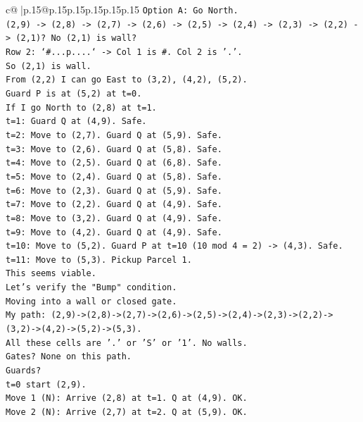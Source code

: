 \documentclass{article}
\begin{document}
{\begin{supertabular}{c@{$\;$}|p{.15\linewidth}@{}p{.15\linewidth}p{.15\linewidth}p{.15\linewidth}p{.15\linewidth}p{.15\linewidth}}
{{{\texttt{Option A: Go North.} \\
\texttt{(2,9) {-}> (2,8) {-}> (2,7) {-}> (2,6) {-}> (2,5) {-}> (2,4) {-}> (2,3) {-}> (2,2) {-}> (2,1)? No (2,1) is wall?} \\
\texttt{Row 2: `\#...p....` {-}> Col 1 is \#. Col 2 is '.'.} \\
\texttt{So (2,1) is wall.} \\
\texttt{From (2,2) I can go East to (3,2), (4,2), (5,2).} \\
\texttt{Guard P is at (5,2) at t=0.} \\
\texttt{If I go North to (2,8) at t=1.} \\
\texttt{t=1: Guard Q at (4,9). Safe.} \\
\texttt{t=2: Move to (2,7). Guard Q at (5,9). Safe.} \\
\texttt{t=3: Move to (2,6). Guard Q at (5,8). Safe.} \\
\texttt{t=4: Move to (2,5). Guard Q at (6,8). Safe.} \\
\texttt{t=5: Move to (2,4). Guard Q at (5,8). Safe.} \\
\texttt{t=6: Move to (2,3). Guard Q at (5,9). Safe.} \\
\texttt{t=7: Move to (2,2). Guard Q at (4,9). Safe.} \\
\texttt{t=8: Move to (3,2). Guard Q at (4,9). Safe.} \\
\texttt{t=9: Move to (4,2). Guard Q at (4,9). Safe.} \\
\texttt{t=10: Move to (5,2). Guard P at t=10 (10 mod 4 = 2) {-}> (4,3). Safe.} \\
\texttt{t=11: Move to (5,3). Pickup Parcel 1.} \\
\texttt{This seems viable.} \\
\texttt{Let's verify the "Bump" condition.} \\
\texttt{Moving into a wall or closed gate.} \\
\texttt{My path: (2,9){-}>(2,8){-}>(2,7){-}>(2,6){-}>(2,5){-}>(2,4){-}>(2,3){-}>(2,2){-}>(3,2){-}>(4,2){-}>(5,2){-}>(5,3).} \\
\texttt{All these cells are '.' or 'S' or '1'. No walls.} \\
\texttt{Gates? None on this path.} \\
\texttt{Guards?} \\
\texttt{t=0 start (2,9).} \\
\texttt{Move 1 (N): Arrive (2,8) at t=1. Q at (4,9). OK.} \\
\texttt{Move 2 (N): Arrive (2,7) at t=2. Q at (5,9). OK.} \\
}}}
\end{supertabular}}
\end{document}
